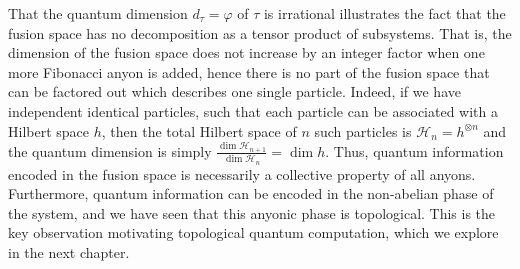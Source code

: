 That the quantum dimension $d_τ = φ$ of $τ$ is irrational illustrates the fact that the fusion space has no decomposition as a tensor product of subsystems. That is, the dimension of the fusion space does not increase by an integer factor when one more Fibonacci anyon is added, hence there is no part of the fusion space that can be factored out which describes one single particle. Indeed, if we have independent identical particles, such that each particle can be associated with a Hilbert space $h$, then the total Hilbert space of $n$ such particles is $\mathcal{H}_n = h^{⊗n}$ and the quantum dimension is simply $\frac{\dim \mathcal{H}_{n+1}}{\dim \mathcal{H}_n} = \dim h$. Thus, quantum information encoded in the fusion space is necessarily a collective property of all anyons. Furthermore, quantum information can be encoded in the non-abelian phase of the system, and we have seen that this anyonic phase is topological. This is the key observation motivating topological quantum computation, which we explore in the next chapter.

